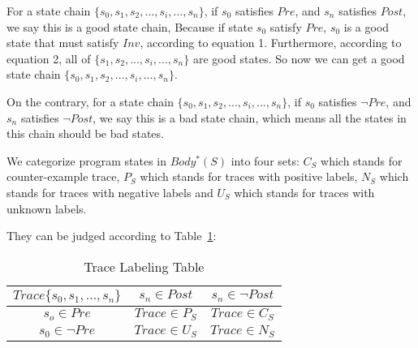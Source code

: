 For a state chain $\{s_0, s_1, s_2, ..., s_i, ... , s_n\}$, 
if $s_0$ satisfies $Pre$, and $s_n$ satisfies $Post$,
we say this is a good state chain,
Because if state $s_0$ satisfy $Pre$,
$s_0$ is a good state that must satisfy $Inv$, according to equation 1.
Furthermore, according to equation 2,
all of $\{s_1, s_2, ..., s_i, ... , s_n\}$ are good states.
So now we can get a good state chain  $\{s_0, s_1, s_2, ..., s_i, ... , s_n\}$.


On the contrary, for a state chain $\{s_0, s_1, s_2, ..., s_i, ... , s_n\}$, 
if $s_0$ satisfies $\neg Pre$, and $s_n$ satisfies $\neg Post$,
we say this is a bad state chain, 
which means all the states in this chain should be bad states.  


We categorize program states in $Body^*(S)$ into four sets:
$C_{S}$ which stands for counter-example trace, 
$P_{S}$ which stands for traces with positive labels, 
$N_{S}$ which stands for traces with negative labels 
and $U_{S}$ which stands for traces with unknown labels.

They can be judged according to Table~\ref{LabelingTable}: 

\begin{table}[htb]
\label{LabelingTable}
\centering
\caption{Trace Labeling Table}
\begin{tabular}[float]{|c|c|c|}
\hline
$Trace\{s_0, s_1, ..., s_n\}$         & $s_n \in Post$                     & $s_n \in \neg Post$\\
\hline
$s_o \in Pre$                 & $Trace \in P_{S}$                & $Trace \in C_{S}$\\
\hline
$s_0 \in \neg Pre$            & $Trace \in U_{S}$         & $Trace \in N_{S}$\\
\hline
\end{tabular}
\end{table}






